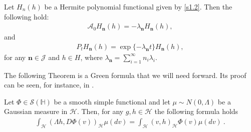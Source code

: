 \documentclass[review, onefignum, onetabnum]{siamart171218}
\begin{document}
\begin{lemma}\label{Pt-Her}
        Let $H_n(h)$ be a Hermite polynomial functional given by \eqref{s1.2}.
        Then the following hold:
    \begin{align}
        \mathcal{A}_0 H_{\mathbf{n}}(h) =
        -\lambda_{\mathbf{n}} H_{\mathbf{n}}(h),
    \end{align}
    and
    \begin{align}
        P_t H_{\mathbf{n}} (h)
        = \exp\{-\lambda_{\mathbf{n}} t\} H_{\mathbf{n}} (h),
    \end{align}
    for any $\mathbf{n}\in\mathcal{J}$ and $h \in H$, where
    $
        \displaystyle
        \lambda_{\mathbf{n}}=\sum_{i=1}^\infty n_i\lambda_i.
    $
\end{lemma}

The following Theorem is a Green formula that we will need forward.
Its proof can be seen, for instance, in \cite[Thm. 3.3, Ch. 9,][]{liu}.

\begin{theorem}\label{green-form}
    Let
    $
        \Phi \in \mathcal{S}(\mathbb{H})
    $ be a smooth simple functional and let
    $\mu\sim N(0,\Lambda)$ be a Gaussian measure in $\mathcal{H}$. Then,
    for any $g,h\in\mathcal{H}$ the following formula holds
    \begin{align}
        \int_{\mathcal{H}} (\Lambda h,D\Phi(v))_{\mathcal{H}}  \mu(dv) =
            \int_{\mathcal{H}} (v,h)_{\mathcal{H}}
            \Phi(v) \mu(dv) \ .
            \label{s2.2.1}
    \end{align}

\end{theorem}
\end{document}
